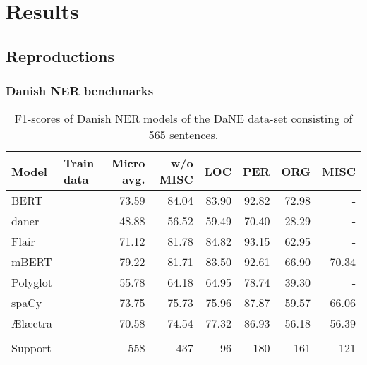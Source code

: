 \documentclass[main.tex]{subfiles}
\begin{document}
\chapter{Results}

\section{Reproductions}
\subsection{Danish NER benchmarks}
\begin{table}
	\begin{center}
		\begin{tabular}{l l r r r r r r}
			Model & Train data & Micro avg. & w/o MISC & LOC & PER & ORG & MISC \\
			\hline
			BERT &  & 73.59 & 84.04 & 83.90 & 92.82 & 72.98 & - \\
			daner &  & 48.88 & 56.52 & 59.49 & 70.40 & 28.29 & - \\
			Flair &  & 71.12 & 81.78 & 84.82 & 93.15 & 62.95 & - \\
			mBERT &  & 79.22 & 81.71 & 83.50 & 92.61 & 66.90 & 70.34 \\
			Polyglot &  & 55.78 & 64.18 & 64.95 & 78.74 & 39.30 & - \\
			spaCy &  & 73.75 & 75.73 & 75.96 & 87.87 & 59.57 & 66.06 \\
			Ælæctra &  & 70.58 & 74.54 & 77.32 & 86.93 & 56.18 & 56.39 \\
			 &  &  &  &  &  &  &  \\
			Support &  & 558 & 437 & 96 & 180 & 161 & 121 \\
		\end{tabular}
	\end{center}
	\caption{F1\pro-scores of Danish NER models of the DaNE data-set consisting of 565 sentences.}
	\label{tab:DaNE}
\end{table}
\end{document}
